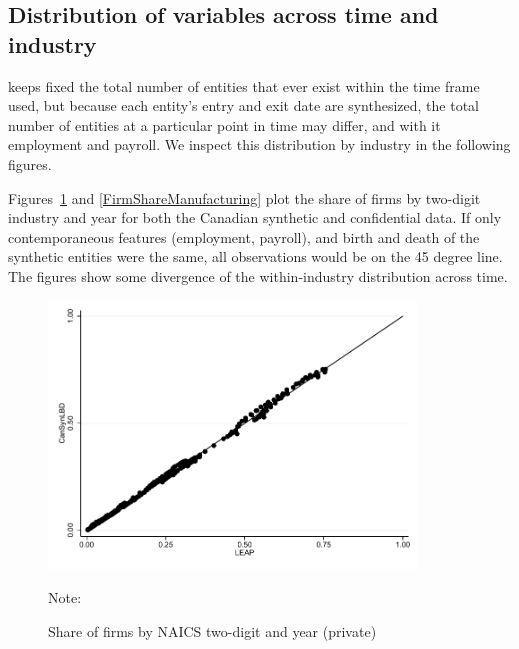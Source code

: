 \subsection{Distribution of variables across time and industry}

\SynLBD{} keeps fixed the total number of entities that ever exist within the time frame used, but because each entity's entry and exit date are synthesized, the total number of entities at a particular point in time may differ, and with it employment and payroll. We inspect this distribution by industry in the following figures. 


Figures~\ref{FirmSharePrivate} and \ref{FirmShareManufacturing} plot the share of firms by two-digit industry and year for both the Canadian synthetic  and confidential data. If only contemporaneous features (employment, payroll), and birth and death of the synthetic entities were the same, all observations would be on the 45 degree line. The figures show some divergence of the within-industry distribution across time. 

\begin{figure} [H]
\centering
\caption{Share of firms by NAICS two-digit and year (private)} \label{FirmSharePrivate}
\includegraphics[height=2.8in, width=.7\linewidth]{graphs/Share_of_firms_by_NAICS_two-digit_and_year_private_bw.pdf} 
\begin{minipage}{0.85\textwidth}
{\footnotesize Note: \CanTableNote \par}
\end{minipage}
\end{figure}


